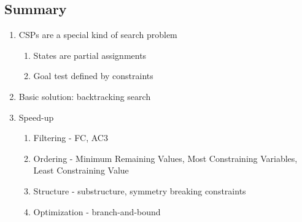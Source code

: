 \subsection{Summary}
\begin{enumerate}
    \item CSPs are a special kind of search problem
    \begin{enumerate}
        \item States are partial assignments
        \item Goal test defined by constraints
    \end{enumerate}
    \item Basic solution: backtracking search
    \item Speed-up
    \begin{enumerate}
        \item Filtering - FC, AC3
        \item Ordering - Minimum Remaining Values, Most Constraining Variables, Least Constraining Value
        \item Structure - substructure, symmetry breaking constraints
        \item Optimization - branch-and-bound
    \end{enumerate}
\end{enumerate}

\pagebreak